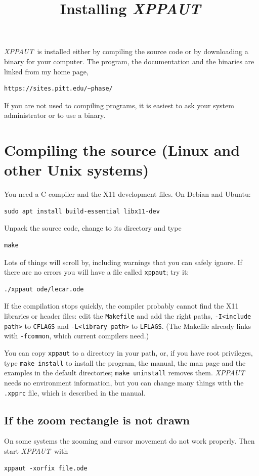 \documentclass{article}
\newcommand{\XPP}{{\sl XPPAUT\, }}
\begin{document}
\title{Installing \XPP}
\date{}
\maketitle
\XPP is installed either by compiling the source code or by downloading a
binary for your computer.  The program, the documentation and the binaries
are linked from my home page,
\begin{verbatim}
https://sites.pitt.edu/~phase/
\end{verbatim}
If you are not used to compiling programs, it is easiest to ask your system
administrator or to use a binary.

\section{Compiling the source (Linux and other Unix systems)}
You need a C compiler and the X11 development files.  On Debian and Ubuntu:
\begin{verbatim}
sudo apt install build-essential libx11-dev
\end{verbatim}
Unpack the source code, change to its directory and type
\begin{verbatim}
make
\end{verbatim}
Lots of things will scroll by, including warnings that you can safely ignore.  If
there are no errors you will have a file called {\tt xppaut}; try it:
\begin{verbatim}
./xppaut ode/lecar.ode
\end{verbatim}
If the compilation stops quickly, the compiler probably cannot find the X11 libraries or
header files: edit the {\tt Makefile} and add the right paths, {\tt -I<include path>} to
{\tt CFLAGS} and {\tt -L<library path>} to {\tt LFLAGS}.  (The Makefile already links with
{\tt -fcommon}, which current compilers need.)

You can copy {\tt xppaut} to a directory in your path, or, if you have root
privileges, type {\tt make install} to install the program, the manual, the man page and the
examples in the default directories; {\tt make uninstall} removes them.  \XPP needs no environment
information, but you can change many things with the {\tt .xpprc} file, which is described in
the manual.

\subsection{If the zoom rectangle is not drawn}
On some systems the zooming and cursor movement do not work properly.  Then start \XPP with
\begin{verbatim}
xppaut -xorfix file.ode
\end{verbatim}
\end{document}

